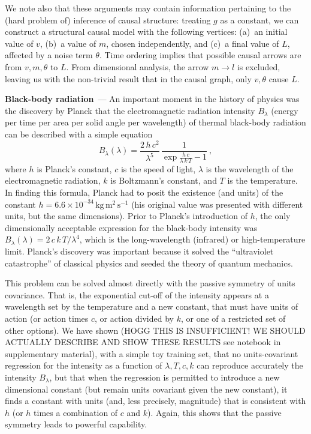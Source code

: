 \documentclass[11pt]{article}
\newcommand{\unit}[1]{\mathrm{#1}}
\newcommand{\kg}{\unit{kg}}
\newcommand{\m}{\unit{m}}
\newcommand{\s}{\unit{s}}
\renewcommand{\paragraph}[1]{\medskip\par\noindent\textbf{#1}~---}
\begin{document}
We note also that these arguments may contain information pertaining to the (hard problem of) inference of causal structure:
treating $g$ as a constant, we can construct a structural causal model with the following vertices: (a)~an initial value of $v$, (b)~a value of $m$, chosen independently, and (c)~a final value of $L$, affected by a noise term $\theta$.
Time ordering implies that possible causal arrows are from $v, m, \theta$ to $L$.
From dimensional analysis, the arrow $m\to l$ is excluded, leaving us with the non-trivial result that in the causal graph, only $v,\theta$ cause $L$.

\paragraph{Black-body radiation}
An important moment in the history of physics was the discovery by Planck that the electromagnetic radiation intensity $B_\lambda$ (energy per time per area per solid angle per wavelength) of thermal black-body radiation can be described with a simple equation \cite{planck}
\begin{equation}
    B_\lambda(\lambda) = \frac{2\,h\,c^2}{\lambda^5}\,\frac{1}{\exp\frac{h\,c}{\lambda\,k\,T} - 1}~,
\end{equation}
where $h$ is Planck's constant,
$c$ is the speed of light,
$\lambda$ is the wavelength of the electromagnetic radiation,
$k$ is Boltzmann's constant,
and $T$ is the temperature.
In finding this formula, Planck had to posit the existence (and units) of the constant $h=6.6\times 10^{-34}\,\kg\,\m^2\,\s^{-1}$ (his original value was presented with different units, but the same dimensions).
Prior to Planck's introduction of $h$, the only dimensionally acceptable expression for the black-body intensity was $B_\lambda(\lambda)=2\,c\,k\,T/\lambda^4$, which is the long-wavelength (infrared) or high-temperature limit.
Planck's discovery was important because it solved the ``ultraviolet catastrophe'' of classical physics and seeded the theory of quantum mechanics.

This problem can be solved almost directly with the passive symmetry of units covariance.
That is, the exponential cut-off of the intensity appears at a wavelength set by the temperature and a new constant, that must have units of action (or action times $c$, or action divided by $k$, or one of a restricted set of other options).
We have shown (HOGG THIS IS INSUFFICIENT! WE SHOULD ACTUALLY DESCRIBE AND SHOW THESE RESULTS see notebook in supplementary material), with a simple toy training set, that no units-covariant regression for the intensity as a function of $\lambda, T, c, k$ can reproduce accurately the intensity $B_\lambda$, but that when the regression is permitted to introduce a new dimensional constant (but remain units covariant given the new constant), it finds a constant with units (and, less precisely, magnitude) that is consistent with $h$ (or $h$ times a combination of $c$ and $k$).
Again, this shows that the passive symmetry leads to powerful capability.
\end{document}

